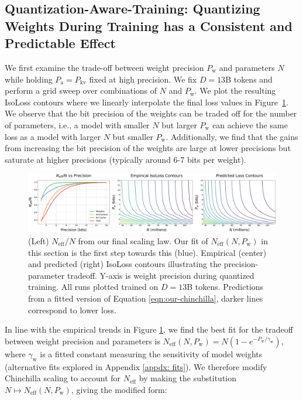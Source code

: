 \documentclass[11pt]{article}
\begin{document}
\subsection{Quantization-Aware-Training: Quantizing Weights During Training has a Consistent and Predictable Effect}

We first examine the trade-off between weight precision $P_\text{w}$ and parameters $N$ while holding $P_\text{a} = P_\text{kv}$ fixed at high precision. We fix $D=13$B tokens and perform a grid sweep over combinations of $N$ and $P_\text{w}$. We plot the resulting IsoLoss contours where we linearly interpolate the final loss values in Figure~\ref{fig:isoloss}. We observe that the bit precision of the weights can be traded off for the number of parameters, i.e., a model with smaller $N$ but larger $P_\text{w}$ can achieve the same loss as a model with larger $N$ but smaller $P_\text{w}$.
Additionally, we find that the gains from increasing the bit precision of the weights are large at lower precisions but saturate at higher precisions (typically around 6-7 bits per weight).

\begin{figure}
    \centering
    \includegraphics[width=\linewidth]{isoloss_N_eff_new_evals.pdf} %
    \caption{ (Left) $N_\text{eff}/N$ from our final scaling law. Our fit of $N_\text{eff}(N, P_\text{w})$ in this section is the first step towards this (blue). Empirical (center) and predicted (right) IsoLoss contours illustrating the precision-parameter tradeoff. Y-axis is weight precision during quantized training. All runs plotted trained on $D = 13$B tokens. Predictions from a fitted version of Equation \ref{eqn:our-chinchilla}, darker lines correspond to lower loss. }
    \label{fig:isoloss}
\end{figure}

In line with the empirical trends in Figure \ref{fig:isoloss}, we find the best fit for the tradeoff between weight precision and parameters is $N_\text{eff}(N, P_\text{w}) = N(1-e^{-P_\text{w}/\gamma_\text{w}})$, where $\gamma_\text{w}$ is a fitted constant measuring the sensitivity of model weights (alternative fits explored in Appendix \ref{appdx: fits}). We therefore modify Chinchilla scaling to account for $N_\text{eff}$ by making the substitution $N \mapsto N_\text{eff}(N, P_\text{w})$, giving the modified form:
\end{document}
